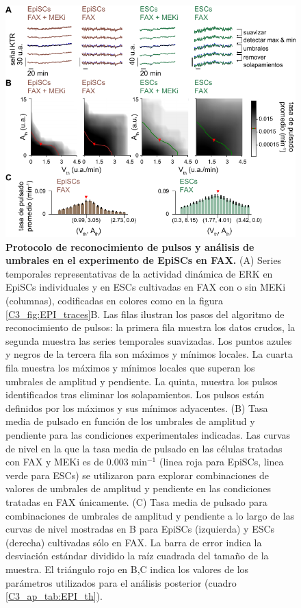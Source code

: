\documentclass[./main.tex]{subfiles}
\begin{document}
\begin{subappendices}
\begin{figure}
    \centering
    \includegraphics[width=1\columnwidth]{figures/chapter3/C3_EpiSC_pulse_detection.pdf}\caption{\textbf{Protocolo de reconocimiento de pulsos y análisis de umbrales en el experimento de EpiSCs en FAX.} 
    (A) Series temporales representativas de la actividad dinámica de ERK en EpiSCs individuales y en ESCs cultivadas en FAX con o sin MEKi (columnas), codificadas en colores como en la figura \ref{C3_fig:EPI_traces}B. Las filas ilustran los pasos del algoritmo de reconocimiento de pulsos: la primera fila muestra los datos crudos, la segunda muestra las series temporales suavizadas. Los puntos azules y negros de la tercera fila son máximos y mínimos locales. La cuarta fila muestra los máximos y mínimos locales que superan los umbrales de amplitud y pendiente. La quinta, muestra los pulsos identificados tras eliminar los solapamientos. Los pulsos están definidos por los máximos y sus mínimos adyacentes. (B) Tasa media de pulsado en función de los umbrales de amplitud y pendiente para las condiciones experimentales indicadas. Las curvas de nivel en la que la tasa media de pulsado en las células tratadas con FAX y MEKi es de $0.003 \; \text{min}^{-1}$ (linea roja para EpiSCs, linea verde para ESCs) se utilizaron para explorar combinaciones de valores de umbrales de amplitud y pendiente en las condiciones tratadas en FAX únicamente. (C) Tasa media de pulsado para combinaciones de umbrales de amplitud y pendiente a lo largo de las curvas de nivel mostradas en B para EpiSCs (izquierda) y ESCs (derecha) cultivadas sólo en FAX. La barra de error indica la desviación estándar dividido la raíz cuadrada del tamaño de la muestra. El triángulo rojo en B,C indica los valores de los parámetros utilizados para el análisis posterior (cuadro \ref{C3_ap_tab:EPI_th}).}
    \label{C3_ap_fig:EPI_pulse_detection}
\end{figure}


\end{subappendices}
\end{document}
